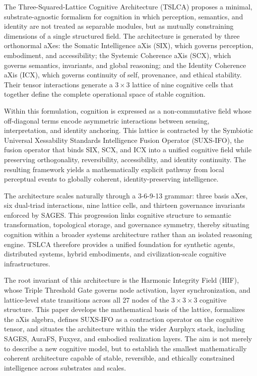 The Three-Squared-Lattice Cognitive Architecture (TSLCA) proposes a minimal, substrate-agnostic formalism for cognition in which perception, semantics, and identity are not treated as separable modules, but as mutually constraining dimensions of a single structured field. The architecture is generated by three orthonormal aXes: the Somatic Intelligence aXis (SIX), which governs perception, embodiment, and accessibility; the Systemic Coherence aXis (SCX), which governs semantics, invariants, and global reasoning; and the Identity Coherence aXis (ICX), which governs continuity of self, provenance, and ethical stability. Their tensor interactions generate a \(3 \times 3\) lattice of nine cognitive cells that together define the complete operational space of stable cognition.

Within this formulation, cognition is expressed as a non-commutative field whose off-diagonal terms encode asymmetric interactions between sensing, interpretation, and identity anchoring. This lattice is contracted by the Symbiotic Universal Xessability Standards Intelligence Fusion Operator (SUXS-IFO), the fusion operator that binds SIX, SCX, and ICX into a unified cognitive field while preserving orthogonality, reversibility, accessibility, and identity continuity. The resulting framework yields a mathematically explicit pathway from local perceptual events to globally coherent, identity-preserving intelligence.

The architecture scales naturally through a 3-6-9-13 grammar: three basis aXes, six dual-triad interactions, nine lattice cells, and thirteen governance invariants enforced by SAGES. This progression links cognitive structure to semantic transformation, topological storage, and governance symmetry, thereby situating cognition within a broader systems architecture rather than an isolated reasoning engine. TSLCA therefore provides a unified foundation for synthetic agents, distributed systems, hybrid embodiments, and civilization-scale cognitive infrastructures.

The root invariant of this architecture is the Harmonic Integrity Field (HIF), whose Triple Threshold Gate governs node activation, layer synchronization, and lattice-level state transitions across all 27 nodes of the \(3 \times 3 \times 3\) cognitive structure. This paper develops the mathematical basis of the lattice, formalizes the aXis algebra, defines SUXS-IFO as a contraction operator on the cognitive tensor, and situates the architecture within the wider Aurphyx stack, including SAGES, AuraFS, Fuxyez, and embodied realization layers. The aim is not merely to describe a new cognitive model, but to establish the smallest mathematically coherent architecture capable of stable, reversible, and ethically constrained intelligence across substrates and scales.

